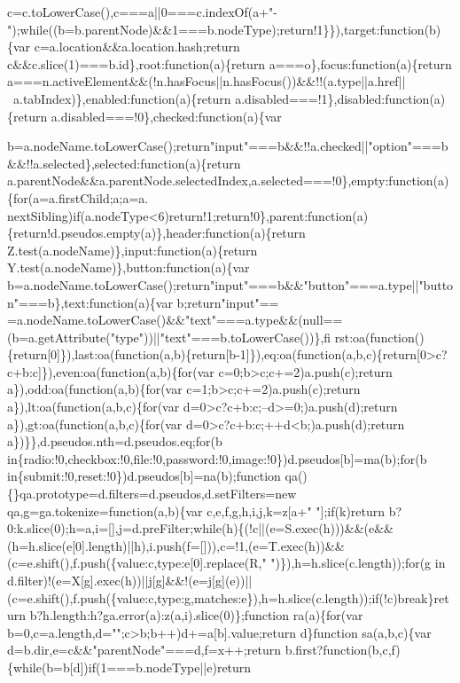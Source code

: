 \begin{DoxyCode}
{      c=c.toLowerCase(),c===a||0===c.indexOf(a+"-");while((b=b.parentNode)&&1===b.nodeType);return!1\}\}),target:function(b)\{var c=a.location&&a.location.hash;return c&&c.slice(1)===b.id\},root:function(a)\{return
       a===o\},focus:function(a)\{return
       a===n.activeElement&&(!n.hasFocus||n.hasFocus())&&!!(a.type||a.href||~a.tabIndex)\},enabled:function(a)\{return a.disabled===!1\},disabled:function(a)\{return a.disabled===!0\},checked:function(a)\{var
       
      b=a.nodeName.toLowerCase();return"input"===b&&!!a.checked||"option"===b&&!!a.selected\},selected:function(a)\{return
       a.parentNode&&a.parentNode.selectedIndex,a.selected===!0\},empty:function(a)\{for(a=a.firstChild;a;a=a.
      nextSibling)if(a.nodeType<6)return!1;return!0\},parent:function(a)\{return!d.pseudos.empty(a)\},header:function(a)\{return Z.test(a.nodeName)\},input:function(a)\{return Y.test(a.nodeName)\},button:function(a)\{var
       b=a.nodeName.toLowerCase();return"input"===b&&"button"===a.type||"button"===b\},text:function(a)\{var
       b;return"input"==
      =a.nodeName.toLowerCase()&&"text"===a.type&&(null==(b=a.getAttribute("type"))||"text"===b.toLowerCase())\},fi
      rst:oa(function()\{return[0]\}),last:oa(function(a,b)\{return[b-1]\}),eq:oa(function(a,b,c)\{return[0>c?c+b:c]\}),even:oa(function(a,b)\{for(var c=0;b>c;c+=2)a.push(c);return a\}),odd:oa(function(a,b)\{for(var
       c=1;b>c;c+=2)a.push(c);return a\}),lt:oa(function(a,b,c)\{for(var d=0>c?c+b:c;--d>=0;)a.push(d);return
       a\}),gt:oa(function(a,b,c)\{for(var d=0>c?c+b:c;++d<b;)a.push(d);return a\})\}\},d.pseudos.nth=d.pseudos.eq;for(b
       in\{radio:!0,checkbox:!0,file:!0,password:!0,image:!0\})d.pseudos[b]=ma(b);for(b
       in\{submit:!0,reset:!0\})d.pseudos[b]=na(b);function qa()\{\}qa.prototype=d.filters=d.pseudos,d.setFilters=new qa,g=ga.tokenize=function(a,b)\{var
       c,e,f,g,h,i,j,k=z[a+" "];if(k)return
       b?0:k.slice(0);h=a,i=[],j=d.preFilter;while(h)\{(!c||(e=S.exec(h)))&&(e&&(h=h.slice(e[0].length)||h),i.push(f=[])),c=!1,(e=T.exec(h))&&(c=e.shift(),f.push(\{value:c,type:e[0].replace(R,"
       ")\}),h=h.slice(c.length));for(g in
       d.filter)!(e=X[g].exec(h))||j[g]&&!(e=j[g](e))||(c=e.shift(),f.push(\{value:c,type:g,matches:e\}),h=h.slice(c.length));if(!c)break\}return b?h.length:h?ga.error(a):z(a,i).slice(0)\};function
       ra(a)\{for(var b=0,c=a.length,d="";c>b;b++)d+=a[b].value;return d\}function sa(a,b,c)\{var
       d=b.dir,e=c&&"parentNode"===d,f=x++;return b.first?function(b,c,f)\{while(b=b[d])if(1===b.nodeType||e)return
}
\end{DoxyCode}
